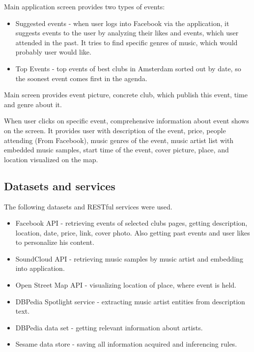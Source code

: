\documentclass[12pt, a4paper, lithuanian]{article}
\begin{document}
  Main application screen provides two types of events:

\begin{itemize}

  \item Suggested events - when user logs into Facebook via the application, it suggests events to the user by analyzing their likes and events, which user attended in the past. It tries to find specific genres of music, which would probably user would like.

  \item Top Events - top events of best clubs in Amsterdam sorted out by date, so the soonest event comes first in the agenda.

\end{itemize}

  Main screen provides event picture, concrete club, which publish this event, time and genre about it.

  When user clicks on specific event, comprehensive information about event shows on the screen. It provides user with description of the event, price, people attending (From Facebook), music genres of the event, music artist list with embedded music samples, start time of the event, cover picture, place, and location visualized on the map.

\subsection{Datasets and services}

  The following datasets and RESTful services were used.

\begin{itemize}

  \item Facebook API - retrieving events of selected clubs pages, getting description, location, date, price, link, cover photo. Also getting past events and user likes to personalize his content.

  \item SoundCloud API - retrieving music samples by music artist and embedding into application.

  \item Open Street Map API - visualizing location of place, where event is held.

  \item DBPedia Spotlight service - extracting music artist entities from description text.

  \item DBPedia data set - getting relevant information about artists.

  \item Sesame data store - saving all information acquired and inferencing rules.

\end{itemize}
\end{document}
